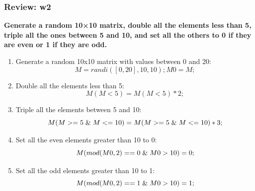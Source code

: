 \documentclass[
	11pt, %
]{beamer}
\begin{document}
\begin{frame}
	\frametitle{Review: w2}

	\textbf{Generate a random 10×10 matrix, double all the elements less than 5, triple all the ones between 5 and 10, and set all the others to 0 if they are even or 1 if they are odd.}

\begin{enumerate}
    \item Generate a random 10x10 matrix with values between 0 and 20:
    \[
    M = randi([0, 20], 10, 10);
    M0 = M; %
    \]

    \item Double all the elements less than 5:
    \[
    M(M < 5) = M(M < 5) * 2;
    \]

    \item Triple all the elements between 5 and 10:
    \[
    M(M >= 5 \hspace{0.1cm} \& \hspace{0.1cm} M <= 10) = M(M >= 5 \hspace{0.1cm} \& \hspace{0.1cm} M <= 10) * 3;
    \]

    \item Set all the even elements greater than 10 to 0:
    \[
    M(mod(M0, 2) == 0 \hspace{0.1cm} \& \hspace{0.1cm} M0 > 10) = 0;
    \]

    \item Set all the odd elements greater than 10 to 1:
    \[
    M(mod(M0, 2) == 1 \hspace{0.1cm} \& \hspace{0.1cm} M0 > 10) = 1;
    \]
\end{enumerate}

\end{frame}

\end{document}
